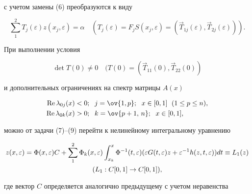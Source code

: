 с учетом замены (6) преобразуются к виду 


\begin{equation} 


\sum^2_1 T_j(\varepsilon)z(x_j,\varepsilon)=\alpha\quad 


(T_j(\varepsilon)=F_j S(x_j,\varepsilon)= 


(\Vec T_{1j}(\varepsilon),\Vec T_{2j}(\varepsilon))). 


\end{equation} 


При выполнении условия 


\begin{equation} 


\det T(0)\ne 0\quad (T(0)=(\Vec T_{11}(0),\Vec T_{22}(0)) 


\end{equation} 


и дополнительных ограничениях на спектр матрицы $A(x)$ 


\begin{equation} 


\begin{split} 


\re\lambda_{0j}(x)&<0;\ \;j=\ov{1,p};\ \; x\in[0,1] 


\ \; (1\le p\le n),\\ 


\re\lambda_{0k}(x)&>0;\ \; k=\ov{p+1,\,n};\ \; x\in[0,1],


\end{split} 


\end{equation} 


можно от задачи (7)--(9) перейти к нелинейному интегральному уравнению 


\begin{gather} 


z(x,\varepsilon)=\Phi(x,\varepsilon)C+\sum^2_1\Phi_k 


(x,\varepsilon)\int^x_{x_k}\Phi^{-1}(t,\varepsilon) 


(\varepsilon G(t,\varepsilon)z+\varepsilon^{-1}h(z,t,\varepsilon)) 


dt\equiv L_1(z)\\


(L_1:C[0,1]\to C[0,1]), \notag


\end{gather} 


где вектор $C$ определяется аналогично предыдущему с учетом неравенства 


